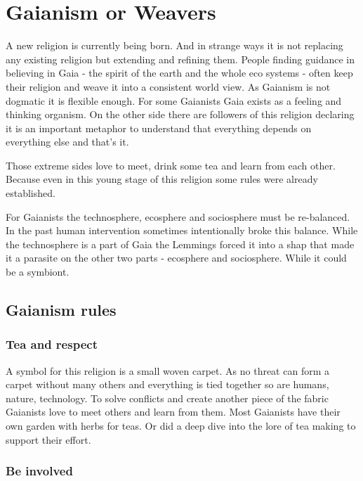 

\chapter {Gaianism or Weavers}

A new religion is currently being born. And in strange ways it is not replacing any existing religion but extending and refining them. People finding guidance in believing in Gaia - the spirit of the earth and the whole eco systems - often keep their religion and weave it into a consistent world view. As Gaianism is not dogmatic it is flexible enough.
For some Gaianists Gaia exists as a feeling and thinking organism. On the other side there are followers of this religion declaring it is an important metaphor to understand that everything depends on everything else and that's it.

Those extreme sides love to meet, drink some tea and learn from each other. Because even in this young stage of this religion some rules were already established.

For Gaianists the technosphere, ecosphere and sociosphere must be re-balanced. In the past human intervention sometimes intentionally broke this balance. While the technosphere is a part of Gaia the Lemmings forced it into a shap that made it a parasite on the other two parts - ecosphere and sociosphere. While it could be a symbiont.

\section{Gaianism rules}

\subsection{Tea and respect}

A symbol for this religion is a small woven carpet. As no threat can form a carpet without many others and everything is tied together so are humans, nature, technology. To solve conflicts and create another piece of the fabric Gaianists love to meet others and learn from them. Most Gaianists have their own garden with herbs for teas. Or did a deep dive into the lore of tea making to support their effort.

\subsection{Be involved}

